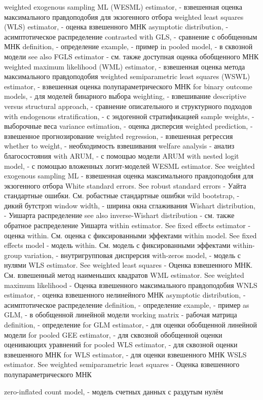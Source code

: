 weighted exogenous sampling ML (WESML) estimator, - взвешенная оценка максимального правдоподобия для экзогенного отбора
weighted least squares (WLS) estimator, - оценка взвешенного МНК
asymptotic distribution, - асимптотическое распределение
contrasted with GLS, - сравнение с обобщенным МНК
definition, - определение
example, - пример
in pooled model, - в сквозной модели 
see also FGLS estimator - см. также доступная оценка обобщенного МНК
weighted maximum likelihood (WML) estimator, - взвешенная оценка метода максимального правдоподобия
weighted semiparametric least squares (WSWL) estimator, - взвешенная оценка полупараметрического МНК
for binary outcome models, - для моделей бинарного выбора
weighting, - взвешивание
descriptive versus structural approach, - сравнение описательного и структурного подходов
with endogenous stratification, - с эндогенной стратификацией
sample weights, - выборочные веса
variance estimation, - оценка дисперсия
weighted prediction, - взвешенное прогнозирование 
weighted regression, - взвешенная регрессия 
whether to weight, - необходимость взвешивания
welfare analysis - анализ благосостояния
with ARUM, - с помощью модели ARUM
with nested logit model, - с помощью вложенных логит-моделей
WESML estimator. See weighted exogenous sampling ML - взвешенная оценка максимального правдоподобия для экзогенного отбора
White standard errors. See robust standard errors - Уайта стандартные ошибки. См. робастные стандартные ошибки
wild bootstrap, - дикий бутстрэп
window width, - ширина окна сглаживания
Wishart distribution, - Уишарта распределение
see also inverse-Wishart distribution - см. также обратное распределение Уишарта
within estimator. See fixed effects estimator - оценка within. См. оценка с фиксированными эффектами
within model. See fixed effects model - модель within. См. модель с фиксированными эффектами
within-group variation, - внутригрупповая диспрерсия
with-zeros model, - модель с нулями
WLS estimator. See weighted least squares - Оценка взвешенного МНК. См. взвешенный метод наименьших квадратов
WML estimator. See weighted maximum likelihood - Оценка взвешенного максимального правдоподобия
WNLS estimator, - оценка взвешенного нелинейного МНК
asymptotic distribution, - асимптотическое распределение
definition, - определение
example, - пример
as GLM, - в обобщенной линейной модели
working matrix - рабочая матрица
definition, - определение
for GLM estimator, - для оценки обобщенной линейной модели
for pooled GEE estimator, - для сквозной обобщенной оценки оценивающих уравнений
for pooled WLS estimator, - для сквозной оценки взвешенного МНК
for WLS estimator, - для оценки взвешенного МНК
WSLS estimator. See weighted semiparametric least squares - Оценка взвешенного полупараметрического МНК

zero-inflated count model, - модель счетных данных с раздутым нулём


